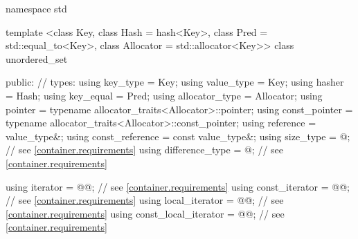 %
\begin{codeblock}
namespace std {
  template <class Key,
            class Hash = hash<Key>,
            class Pred = std::equal_to<Key>,
            class Allocator = std::allocator<Key>>
  class unordered_set {
  public:
    // types:
    using key_type             = Key;
    using value_type           = Key;
    using hasher               = Hash;
    using key_equal            = Pred;
    using allocator_type       = Allocator;
    using pointer              = typename allocator_traits<Allocator>::pointer;
    using const_pointer        = typename allocator_traits<Allocator>::const_pointer;
    using reference            = value_type&;
    using const_reference      = const value_type&;
    using size_type            = @\impdef@; // see \ref{container.requirements}
    using difference_type      = @\impdef@; // see \ref{container.requirements}

    using iterator             = @@; // see \ref{container.requirements}
    using const_iterator       = @@; // see \ref{container.requirements}
    using local_iterator       = @@; // see \ref{container.requirements}
    using const_local_iterator = @@; // see \ref{container.requirements}

}}
\end{codeblock}
